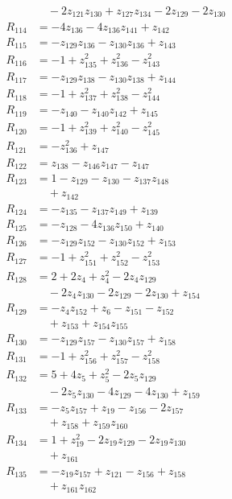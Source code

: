 \begin{align*}
&\quad -2z_{121}z_{130} +z_{127}z_{134} -2z_{129} -2z_{130} \\
R_{114} &= -4z_{136} -4z_{136}z_{141} +z_{142} \\
R_{115} &= -z_{129}z_{136} -z_{130}z_{136} +z_{143} \\
R_{116} &= -1 +z_{135}^{2} +z_{136}^{2} -z_{143}^{2} \\
R_{117} &= -z_{129}z_{138} -z_{130}z_{138} +z_{144} \\
R_{118} &= -1 +z_{137}^{2} +z_{138}^{2} -z_{144}^{2} \\
R_{119} &= -z_{140} -z_{140}z_{142} +z_{145} \\
R_{120} &= -1 +z_{139}^{2} +z_{140}^{2} -z_{145}^{2} \\
R_{121} &= -z_{136}^{2} +z_{147} \\
R_{122} &= z_{138} -z_{146}z_{147} -z_{147} \\
R_{123} &= 1 -z_{129} -z_{130} -z_{137}z_{148} \\
&\quad +z_{142} \\
R_{124} &= -z_{135} -z_{137}z_{149} +z_{139} \\
R_{125} &= -z_{128} -4z_{136}z_{150} +z_{140} \\
R_{126} &= -z_{129}z_{152} -z_{130}z_{152} +z_{153} \\
R_{127} &= -1 +z_{151}^{2} +z_{152}^{2} -z_{153}^{2} \\
R_{128} &= 2 +2z_{4} +z_{4}^{2} -2z_{4}z_{129} \\
&\quad -2z_{4}z_{130} -2z_{129} -2z_{130} +z_{154} \\
R_{129} &= -z_{4}z_{152} +z_{6} -z_{151} -z_{152} \\
&\quad +z_{153} +z_{154}z_{155} \\
R_{130} &= -z_{129}z_{157} -z_{130}z_{157} +z_{158} \\
R_{131} &= -1 +z_{156}^{2} +z_{157}^{2} -z_{158}^{2} \\
R_{132} &= 5 +4z_{5} +z_{5}^{2} -2z_{5}z_{129} \\
&\quad -2z_{5}z_{130} -4z_{129} -4z_{130} +z_{159} \\
R_{133} &= -z_{5}z_{157} +z_{19} -z_{156} -2z_{157} \\
&\quad +z_{158} +z_{159}z_{160} \\
R_{134} &= 1 +z_{19}^{2} -2z_{19}z_{129} -2z_{19}z_{130} \\
&\quad +z_{161} \\
R_{135} &= -z_{19}z_{157} +z_{121} -z_{156} +z_{158} \\
&\quad +z_{161}z_{162} \\

\end{align*}
